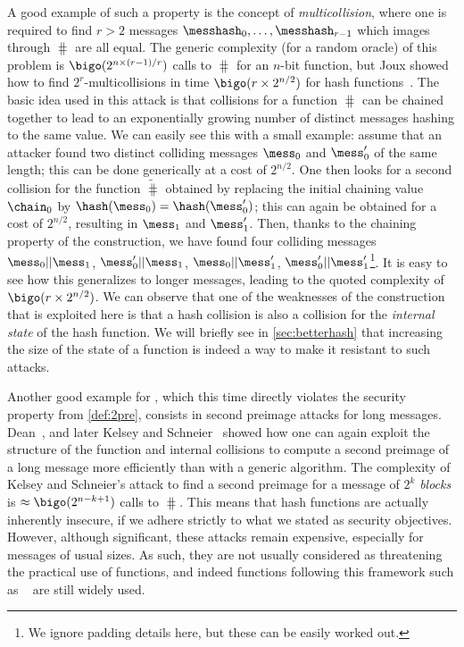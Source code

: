 A good example of such a property is the concept of \emph{multicollision}, where one is required to find $r > 2$ messages $\messhash_{0},\ldots,\messhash_{r-1}$ which images through $\hash$
are all equal. The generic complexity (\eg for a random oracle) of this problem is $\bigo(2^{n\times (r-1)/r})$ calls to $\hash$ for an $n$-bit function, but Joux showed how to
find $2^r$-multicollisions in time $\bigo(r\times 2^{n/2})$ for \merkdam hash functions~\cite{DBLP:conf/crypto/Joux04}.
The basic idea used in this attack is that collisions for a \merkdam function $\hash$ can be chained together to lead to an exponentially growing number of distinct messages hashing
to the same value. We can easily see this with a small example: assume that an attacker found two distinct colliding messages $\mess_0$ and $\mess'_0$ of the same length;
this can be done generically at a cost of $2^{n/2}$. One then looks for a second collision for the function $\widetilde \hash$ obtained by replacing the initial chaining
value $\chain_0$ by $\hash(\mess_0) = \hash(\mess'_0)$; this can again be obtained for a cost of $2^{n/2}$, resulting in $\mess_1$ and $\mess'_1$. Then, thanks to
the chaining property of the \merkdam construction, we have found four colliding messages $\mess_0||\mess_1$, $\mess'_0||\mess_1$, $\mess_0||\mess'_1$, $\mess'_0||\mess'_1$\footnote{We ignore
padding details here, but these can be easily worked out.}. It is easy to see how this generalizes to longer messages, leading to the quoted complexity of $\bigo(r \times 2^{n/2})$.
We can observe that one of the weaknesses of the construction that is exploited here is that a hash collision is also
a collision for the \emph{internal state} of the hash function. We will briefly see in \autoref{sec:betterhash} that increasing the size of the state of a function is indeed a way to make it resistant
to such attacks.

Another good example for \merkdam, which this time directly violates the security property from \autoref{def:2pre}, consists in second preimage attacks for long messages.
Dean~\cite{dean}, and later Kelsey and Schneier~\cite{DBLP:conf/eurocrypt/KelseyS05} showed how one can again exploit the structure of the function and internal collisions to compute a second preimage
of a long message more efficiently than with a generic algorithm. The complexity of Kelsey and Schneier's attack to find a second preimage for a message
of $2^k$ \emph{blocks} is $\approx \bigo(2^{n-k+1})$ calls to $\hash$. This means that \merkdam hash functions are actually inherently insecure, if we adhere
strictly to what we stated as security objectives. However, although significant, these attacks remain expensive, especially for messages of usual sizes. As such, they are not usually considered as threatening
the practical use of \merkdam functions, and indeed functions following this framework such as \shatwo~\cite{Nist-SHA} are still widely used.

